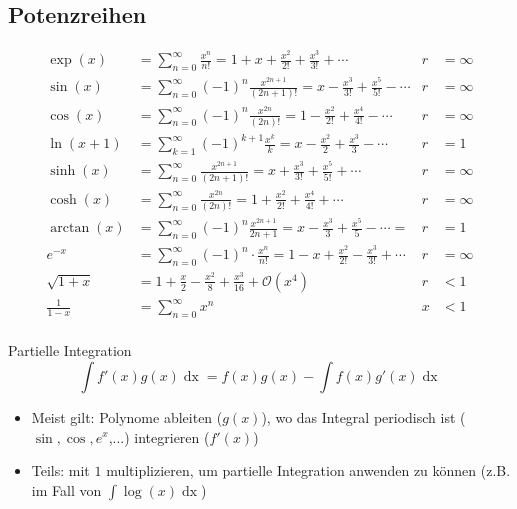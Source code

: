 \documentclass[a4paper,10pt]{article}
\def\sumn{\sum_{n=0}^\infty}
\def\sumk{\sum_{k=1}^\infty}
\begin{document}
\subsection{Potenzreihen}
\begin{align*}
	\exp(x)         & = \sumn \frac{x^n}{n!} = 1 + x + \frac{x^2}{2!} + \frac{x^3}{3!} + \cdots                  & r & = \infty \\
	\sin(x)         & = \sumn (-1)^n \frac{x^{2n + 1}}{(2n + 1)!} = x - \frac{x^3}{3!} + \frac{x^5}{5!} - \cdots & r & = \infty \\
	\cos(x)         & = \sumn (-1)^n \frac{x^{2n}}{(2n)!} = 1 - \frac{x^2}{2!} + \frac{x^4}{4!} - \cdots         & r & = \infty \\
	\ln(x + 1)      & = \sumk (-1)^{k+1} \frac{x^k}{k} = x - \frac{x^2}{2} + \frac{x^3}{3} - \cdots              & r & = 1      \\
	\sinh(x)        & = \sumn \frac{x^{2n+1}}{(2n+1)!} = x + \frac{x^3}{3!} + \frac{x^5}{5!} + \cdots            & r & = \infty \\
	\cosh(x)        & = \sumn \frac{x^{2n}}{(2n)!} = 1 + \frac{x^2}{2!} + \frac{x^4}{4!} + \cdots                & r & = \infty \\
	\arctan(x)      & = \sumn (-1)^n \frac{x^{2n+1}}{2n+1} = x - \frac{x^3}{3} + \frac{x^5}{5} - \cdots =        & r & = 1      \\
	e^{-x}          & = \sumn (-1)^n \cdot \frac{x^n}{n!} = 1 - x + \frac{x^2}{2!} - \frac{x^3}{3!} + \cdots     & r & = \infty \\
	\sqrt{1+x}      & = 1 + \frac{x}{2} - \frac{x^2}{8} + \frac{x^3}{16} + \mathcal{O}(x^4)                      & r & < 1      \\
	\frac{1}{1 - x} & = \sumn x^n                                                                                & x & < 1      \\
\end{align*}

\begin{mainbox}{Partielle Integration}
	$$\int f'(x) g(x) \mathop{dx} = f(x)g(x) - \int f(x) g'(x) \mathop{dx}$$
\end{mainbox}

\begin{itemize}
	\item Meist gilt: Polynome ableiten ($g(x)$), wo das Integral periodisch ist ($\sin, \cos, e^x$,...) integrieren ($f'(x)$)
	\item Teils: mit $1$ multiplizieren, um partielle Integration anwenden zu können (z.B. im Fall von $\int \log(x) \mathop{dx}$)
\end{itemize}
\end{document}

